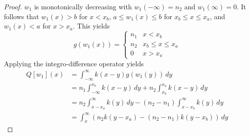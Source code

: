 \documentclass[11pt]{article}
\newtheorem{lem}[thm]{Lemma}
\theoremstyle{definition}
\numberwithin{equation}{section}
\numberwithin{thm}{section}
\renewcommand{\a}{a}
\renewcommand{\b}{b}
\newcommand{\m}{n_1}
\newcommand{\mtwo}{n_2}
\begin{document}
%
%




\begin{proof}
$w_1$ is monotonically decreasing with $w_1(-\infty)=\mtwo$ and $w_1(\infty)=0$. It follows that $w_1(x)>\b$ for $x<x_\b$, $\a\leq w_1(x)\leq\b$ for $x_\b\leq x\leq x_\a$, and $w_1(x)<\a$ for $x>x_\a$. This yields
\begin{equation}
g(w_1(x)) = \begin{cases}
\m & x < x_\b \\
\mtwo & x_\b \leq x \leq x_\a \\
0 & x > x_\a
\end{cases}
\end{equation}
Applying the integro-difference operator yields
\begin{equation} \label{qw1calculation}
\begin{aligned}
Q[w_1](x) &= \int_{-\infty}^{\infty} k(x-y) g(w_1(y)) \, dy \\
&= \m \int_{-\infty}^{x_\b} k(x-y) \, dy + \mtwo \int_{x_\b}^{x_\a} k(x-y) \, dy \\
&= \mtwo \int_{x-x_\a}^{\infty} k(y) \, dy - (\mtwo-\m) \int_{x-x_\b}^{\infty} k(y) \, dy \\
&= \int_{x}^{\infty} \left( \mtwo k(y-x_\a)  - (\mtwo-\m)k(y-x_\b)\right) \, dy
\end{aligned} \end{equation}




\end{proof}
\end{document}
